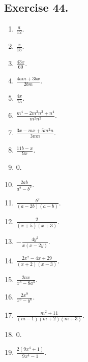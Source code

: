 \documentclass{book}
\begin{document}
\subsection*{Exercise 44.}
\begin{enumerate}

\item $\displaystyle \frac{a}{12}$.

\item $\displaystyle \frac{x}{15}$.

\item $\displaystyle \frac{43 x}{60}$.

\item $\displaystyle \frac{4 a m + 3 b x}{2 b m}$.

\item $\displaystyle \frac{4 x}{15}$.

\item $\displaystyle \frac{m^{4} - 2 m^{2} n^{2} + n^{4}}{m^{2}
n^{2}}$.

\item $\displaystyle \frac{3 x - m x + 5 m^{2} n}{3 m n}$.

\item $\displaystyle \frac{11 b - x}{9 x}$.

\item 0.

\item $\displaystyle \frac{2 a b}{a^{2} - b^{2}}$.

\item $\displaystyle \frac{b^{2}}{(a - 2 b)(a - b)}$.

\item $\displaystyle \frac{2}{(x + 5)(x + 3)}$.

\item $\displaystyle - \frac{4 y^{2}}{x (x - 2 y)}$.

\item $\displaystyle \frac{2 x^{2} - 4 x + 29}{(x + 2)(x - 3)}$.

\item $\displaystyle \frac{2 a x}{x^{3} - 8 a^{3}}$.

\item $\displaystyle \frac{2 x^{9}}{x^{6} - y^{6}}$.

\item $\displaystyle \frac{m^{2} + 11}{(m - 1)(m + 2)(m + 3)}$.

\item 0.

\item $\displaystyle \frac{2(9 x^{4} + 1)}{9 x^{4} - 1}$.


\end{enumerate}
\end{document}
